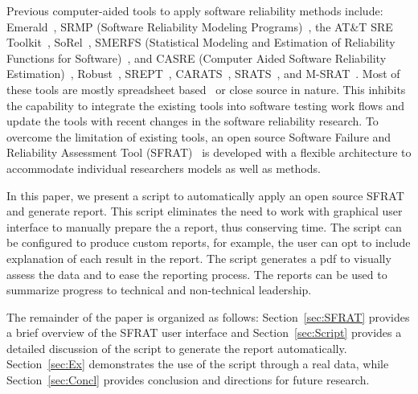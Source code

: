 \documentclass[journal]{IEEEtran}
\begin{document}
Previous computer-aided tools to apply software reliability methods include: Emerald~\cite{1996hudepohlemerald}, SRMP (Software Reliability Modeling Programs)~\cite{1988SRMP}, the AT\&T SRE Toolkit~\cite{1990ATT}, SoRel~\cite{1993kanounsorel}, SMERFS (Statistical Modeling and Estimation of Reliability Functions for Software)~\cite{trSMERFS}, and CASRE (Computer Aided Software Reliability Estimation)~\cite{lyu1992casre}, Robust~\cite{1995lirobust}, SREPT~\cite{2000ramanisrept}, CARATS~\cite{2011huangestimation}, SRATS~\cite{inProcISSRE2013_100}, and M-SRAT~\cite{2015shibatam}. Most of these tools are mostly spreadsheet based~\cite{inProcISSRE2013_100} or close source in nature. This inhibits the capability to integrate the existing tools into software testing work flows and update the tools with recent changes in the software reliability research. To overcome the limitation of existing tools, an open source Software Failure and Reliability Assessment Tool (SFRAT)~\cite{cFio53} is developed with a flexible architecture to accommodate individual researchers models as well as methods.

In this paper, we present a script to automatically apply an open source SFRAT and generate report. This script eliminates the need to work with graphical user interface to manually prepare the a report, thus conserving time. The script can be configured to produce custom reports, for example, the user can opt to include explanation of each result in the report. The script generates a pdf to visually assess the data and to ease the reporting process. The reports can be used to summarize progress to technical and non-technical leadership.

The remainder of the paper is organized as follows: Section~\ref{sec:SFRAT} provides a brief overview of the SFRAT user interface and Section~\ref{sec:Script} provides a detailed discussion of the script to generate the report automatically. Section~\ref{sec:Ex} demonstrates the use of the script through a real data, while Section~\ref{sec:Concl} provides conclusion and directions for future research.
\end{document}
